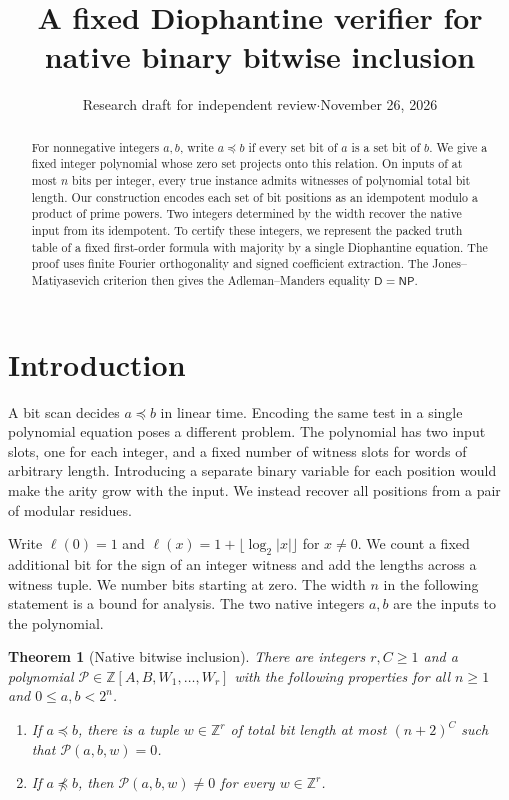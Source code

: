 \documentclass[11pt,letterpaper]{article}
\title{A fixed Diophantine verifier for\\native binary bitwise inclusion}
\author{}
\date{Research draft for independent review\enspace$\cdot$\enspace November 26, 2026}
\newtheorem{theorem}{Theorem}[section]
\numberwithin{equation}{section}
\newcommand{\ZZ}{\mathbb Z}
\newcommand{\DD}{\mathsf D}
\newcommand{\NP}{\mathsf{NP}}
\begin{document}
\maketitle
\begin{abstract}
For nonnegative integers $a,b$, write $a\preceq b$ if every set bit of $a$ is a set bit of $b$. We give a fixed integer polynomial whose zero set projects onto this relation. On inputs of at most $n$ bits per integer, every true instance admits witnesses of polynomial total bit length. Our construction encodes each set of bit positions as an idempotent modulo a product of prime powers. Two integers determined by the width recover the native input from its idempotent. To certify these integers, we represent the packed truth table of a fixed first-order formula with majority by a single Diophantine equation. The proof uses finite Fourier orthogonality and signed coefficient extraction. The Jones--Matiyasevich criterion then gives the Adleman--Manders equality $\DD=\NP$.
\end{abstract}

\section{Introduction}\label{sec:intro}
A bit scan decides $a\preceq b$ in linear time. Encoding the same test in a single polynomial equation poses a different problem. The polynomial has two input slots, one for each integer, and a fixed number of witness slots for words of arbitrary length. Introducing a separate binary variable for each position would make the arity grow with the input. We instead recover all positions from a pair of modular residues.

Write $\ell(0)=1$ and $\ell(x)=1+\lfloor\log_2|x|\rfloor$ for $x\ne0$. We count a fixed additional bit for the sign of an integer witness and add the lengths across a witness tuple. We number bits starting at zero. The width $n$ in the following statement is a bound for analysis. The two native integers $a,b$ are the inputs to the polynomial.

\begin{theorem}[Native bitwise inclusion]\label{thm:main}
There are integers $r,C\ge1$ and a polynomial
$\mathcal P\in\ZZ[A,B,W_1,\ldots,W_r]$ with the following properties for all $n\ge1$ and $0\le a,b<2^n$.
\begin{enumerate}[label=\textup{(\roman*)}]
\item If $a\preceq b$, there is a tuple $w\in\ZZ^r$ of total bit length at most $(n+2)^C$ such that $\mathcal P(a,b,w)=0$.
\item If $a\not\preceq b$, then $\mathcal P(a,b,w)\ne0$ for every $w\in\ZZ^r$.
\end{enumerate}
\end{theorem}
\end{document}
